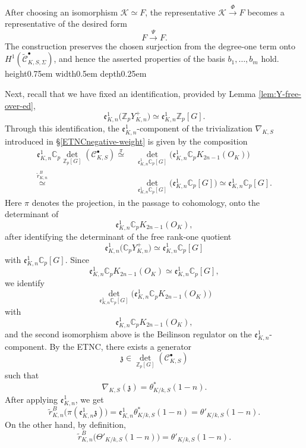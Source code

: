 \documentclass[a4paper,11pt]{article}
\newenvironment{proof}[1][Proof]{\begin{trivlist}
\item[\hskip \labelsep {\bfseries #1}]}{\end{trivlist}}
\newcommand{\qed}{\nobreak \ifvmode \relax \else
    \ifdim\lastskip<1.5em \hskip-\lastskip
     \hskip1.5em plus0em minus0.5em \fi \nobreak
      \vrule height0.75em width0.5em depth0.25em\fi}
\begin{document}
\begin{proof}
\noindent After choosing an isomorphism $\mathcal K\simeq F$, the representative
\(
\mathcal K
\stackrel{\Phi}{\longrightarrow}
F
\)
becomes a representative of the desired form
\[
F
\stackrel{\Psi}{\longrightarrow}
F.
\]
The construction preserves the chosen surjection from the degree-one term onto
$H^1(\widetilde{\mathcal C}_{K,S,\Sigma}^{\bullet})$, and hence the asserted
properties of the basis $b_1,\ldots,b_m$ hold.\qed
\end{proof}
Next, recall that we have fixed an identification, provided by Lemma \ref{lem:Y-free-over-ed},
\[
\mathfrak e_{K,n}^1
\bigl(\mathbb{Z}_pY_{K,n}^{+}\bigr)
\simeq
\mathfrak e_{K,n}^1\mathbb Z_p[G].
\]
Through this identification, the \(\mathfrak e_{K,n}^1\)-component of the
trivialization \(\nabla_{K,S}\) introduced in
\S \ref{ETNCnegative-weight} is given by the composition
\[
\begin{aligned}
\mathfrak e_{K,n}^1\mathbb C_p
\operatorname{det}_{\mathbb Z_p[G]}(\mathcal C_{K,S}^{\bullet})
\stackrel{\pi}{\simeq}&\;
\operatorname{det}_{\mathfrak e_{K,n}^1\mathbb C_p[G]}
\bigl(\mathfrak e_{K,n}^1\mathbb C_pK_{2n-1}(O_K)\bigr)\\
\stackrel{\widetilde r^B_{K,n}}{\simeq}&\;
\operatorname{det}_{\mathfrak e_{K,n}^1\mathbb C_p[G]}
\bigl(\mathfrak e_{K,n}^1\mathbb C_p[G]\bigr)
\simeq
\mathfrak e_{K,n}^1\mathbb C_p[G].
\end{aligned}
\]
Here \(\pi\) denotes the projection, in the passage to cohomology, onto the
determinant of
\[
\mathfrak e_{K,n}^1\mathbb C_pK_{2n-1}(O_K),
\]
after identifying the determinant of the free rank-one quotient
\[
\mathfrak e_{K,n}^1
\bigl(\mathbb C_pY_{K,n}^{+}\bigr)
\simeq
\mathfrak e_{K,n}^1\mathbb C_p[G]
\]
with \(\mathfrak e_{K,n}^1\mathbb C_p[G]\). Since
\[
\mathfrak e_{K,n}^1\mathbb C_pK_{2n-1}(O_K)
\simeq
\mathfrak e_{K,n}^1\mathbb C_p[G],
\]
we identify
\[
\operatorname{det}_{\mathfrak e_{K,n}^1\mathbb C_p[G]}
\bigl(\mathfrak e_{K,n}^1\mathbb C_pK_{2n-1}(O_K)\bigr)
\]
with
\[
\mathfrak e_{K,n}^1\mathbb C_pK_{2n-1}(O_K),
\]
and the second isomorphism above is the Beilinson regulator on the
\(\mathfrak e_{K,n}^1\)-component.
By the ETNC, there exists a generator
\[
\mathfrak z\in
\operatorname{det}_{\mathbb Z_p[G]}(\mathcal C_{K,S}^{\bullet})
\]
such that
\[
\nabla_{K,S}(\mathfrak z)=\theta^*_{K/k,S}(1-n).
\]
After applying \(\mathfrak e_{K,n}^1\), we get
\[
\widetilde r^B_{K,n}\bigl(\pi(\mathfrak e_{K,n}^1\mathfrak z)\bigr)
=
\mathfrak e_{K,n}^1\theta^*_{K/k,S}(1-n)
=
\theta'_{K/k,S}(1-n).
\]
On the other hand, by definition,
\[
\widetilde r^B_{K,n}\bigl(\Theta'_{K/k,S}(1-n)\bigr)
=
\theta'_{K/k,S}(1-n).
\]
\end{document}
